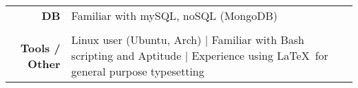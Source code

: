 \documentclass[11pt,line,centered]{res}
\begin{document}
\begin{resume}
\begin{tabulary}{\textwidth}{rJ}
        \footnotesize{\bfseries DB} & Familiar with mySQL, noSQL (MongoDB)\\
        \\

        \footnotesize{\bfseries Tools / Other} & Linux user (Ubuntu, Arch) | Familiar with Bash scripting and Aptitude | Experience using \LaTeX\ for general purpose typesetting\\

    \end{tabulary}



\end{resume}
\end{document}
